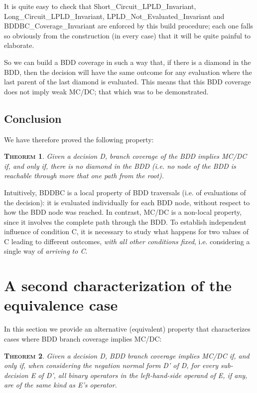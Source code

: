 \documentclass[a4paper,12pt,twoside]{article}
\newtheorem{theorem}{\textsc{Theorem}}
\begin{document}
It is quite easy to check that Short\_Circuit\_LPLD\_Invariant,
Long\_Circuit\_LPLD\_Invariant, LPLD\_Not\_Evaluated\_Invariant and
BDDBC\_Coverage\_Invariant are enforced by this build procedure; each
one falls so obviously from the construction (in every case) that
it will be quite painful to elaborate.

So we can build a BDD coverage in such a way that, if there is a
diamond in the BDD, then the decision will have the same outcome for
any evaluation where the last parent of the last diamond is
evaluated. This means that this BDD coverage does not imply weak
MC/DC; that which was to be demonstrated.

\subsection{Conclusion}

We have therefore proved the following property:

\begin{theorem}
  \label{thm:no-diamond}
  Given a decision D, branch coverage of the BDD implies MC/DC if,
  and only if, there is no diamond in the BDD (i.e.  no node of the
  BDD is reachable through more that one path from the root).
\end{theorem}

Intuitively, BDDBC is a local property of BDD traversals (i.e. of evaluations
of the decision): it is evaluated individually for each BDD node, without
respect to how the BDD node was reached. In contrast, MC/DC is a non-local
property, since it involves the complete path through the BDD. To establish
independent influence of condition C, it is necessary to study what happens
for two values of C leading to different outcomes, \emph{with all other
conditions fixed}, i.e. considering a single way of \emph{arriving to C}.

\section{A second characterization of the equivalence case}

In this section we provide an alternative (equivalent) property
that characterizes cases where BDD branch coverage implies MC/DC:

\begin{theorem}
  \label{thm:lhs-same-operator}
  Given a decision D, BDD branch coverage implies MC/DC if, and only if, when
  considering the negation normal form D' of D, for every sub-decision E of D',
  all binary operators in the left-hand-side operand of E, if any, are of the
  same kind as E's operator.
\end{theorem}
\end{document}
